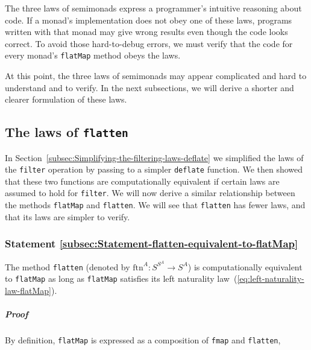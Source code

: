 The three laws of semimonads express a programmer\textsf{'}s intuitive reasoning
about code. If a monad\textsf{'}s implementation does not obey one of these
laws, programs written with that monad may give wrong results even
though the code looks correct. To avoid those hard-to-debug errors,
we must verify that the code for every monad\textsf{'}s \lstinline!flatMap!
method obeys the laws. 

\begin{comment}
It is also hard to verify these laws for a specific given code of
the \lstinline!flatMap! function. 
\end{comment}
At this point, the three laws of semimonads may appear complicated
and hard to understand and to verify. In the next subsections, we
will derive a shorter and clearer formulation of these laws.

\subsection{The laws of \texttt{flatten}}

In Section~\ref{subsec:Simplifying-the-filtering-laws-deflate} we
simplified the laws of the \lstinline!filter! operation by passing
to a simpler \lstinline!deflate! function. We then showed that these
two functions are computationally equivalent if certain laws are assumed
to hold for \lstinline!filter!. We will now derive a similar relationship
between the methods \lstinline!flatMap! and \lstinline!flatten!.
We will see that \lstinline!flatten! has fewer laws, and that its
laws are simpler to verify.

\subsubsection{Statement \label{subsec:Statement-flatten-equivalent-to-flatMap}\ref{subsec:Statement-flatten-equivalent-to-flatMap}}

The method \lstinline!flatten! (denoted by $\text{ftn}^{A}:S^{S^{A}}\rightarrow S^{A}$)
is computationally equivalent
to \lstinline!flatMap! as long as \lstinline!flatMap! satisfies
its left naturality law~(\ref{eq:left-naturality-law-flatMap}).

\subparagraph{Proof}

By definition, \lstinline!flatMap! is expressed as a composition
of \lstinline!fmap! and \lstinline!flatten!,

